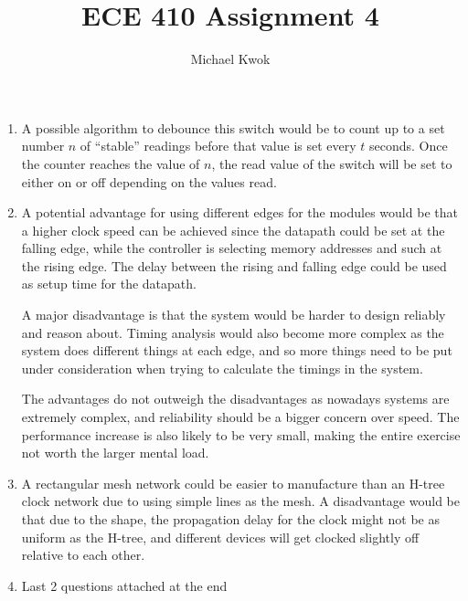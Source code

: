 \documentclass{article}
\title{ECE 410 Assignment 4}
\author{Michael Kwok}
\begin{document}
\maketitle

\begin{enumerate}
  \item A possible algorithm to debounce this switch would be to count up to a set number \(n\) of ``stable'' readings before that value is set every \(t\) seconds. Once the counter reaches the value of \(n\), the read value of the switch will be set to either on or off depending on the values read.

  \item A potential advantage for using different edges for the modules would be that a higher clock speed can be achieved since the datapath could be set at the falling edge, while the controller is selecting memory addresses and such at the rising edge. The delay between the rising and falling edge could be used as setup time for the datapath.

        A major disadvantage is that the system would be harder to design reliably and reason about. Timing analysis would also become more complex as the system does different things at each edge, and so more things need to be put under consideration when trying to calculate the timings in the system.

        The advantages do not outweigh the disadvantages as nowadays systems are extremely complex, and reliability should be a bigger concern over speed. The performance increase is also likely to be very small, making the entire exercise not worth the larger mental load.

  \item A rectangular mesh network could be easier to manufacture than an H-tree clock network due to using simple lines as the mesh. A disadvantage would be that due to the shape, the propagation delay for the clock might not be as uniform as the H-tree, and different devices will get clocked slightly off relative to each other.

  \item Last 2 questions attached at the end
\end{enumerate}
\end{document}
